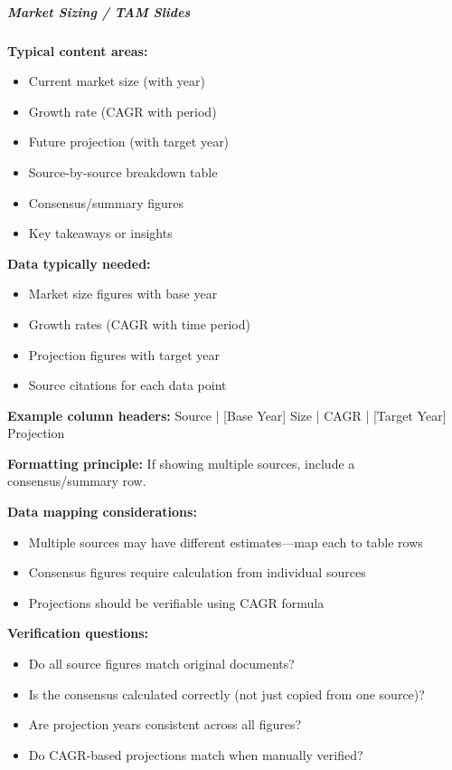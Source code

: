 \documentclass[11pt]{article}
\begin{document}
\subparagraph{Market Sizing / TAM Slides}\mbox{}\par

\textbf{Typical content areas:}

\begin{itemize}[leftmargin=*,itemsep=2pt,topsep=2pt]
\item {} Current market size (with year)
\item {} Growth rate (CAGR with period)
\item {} Future projection (with target year)
\item {} Source-by-source breakdown table
\item {} Consensus/summary figures
\item {} Key takeaways or insights
\end{itemize}

\textbf{Data typically needed:}

\begin{itemize}[leftmargin=*,itemsep=2pt,topsep=2pt]
\item {} Market size figures with base year
\item {} Growth rates (CAGR with time period)
\item {} Projection figures with target year
\item {} Source citations for each data point
\end{itemize}

\textbf{Example column headers:} Source | [Base Year] Size | CAGR | [Target Year] Projection


\textbf{Formatting principle:} If showing multiple sources, include a consensus/summary row.


\textbf{Data mapping considerations:}

\begin{itemize}[leftmargin=*,itemsep=2pt,topsep=2pt]
\item {} Multiple sources may have different estimates—map each to table rows
\item {} Consensus figures require calculation from individual sources
\item {} Projections should be verifiable using CAGR formula
\end{itemize}

\textbf{Verification questions:}

\begin{itemize}[leftmargin=*,itemsep=2pt,topsep=2pt]
\item {} Do all source figures match original documents?
\item {} Is the consensus calculated correctly (not just copied from one source)?
\item {} Are projection years consistent across all figures?
\item {} Do CAGR-based projections match when manually verified?
\end{itemize}
\end{document}
